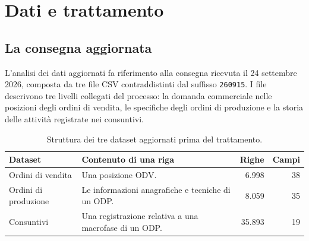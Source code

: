 \section{Dati e trattamento}
\label{sec:data-and-treatment}

\subsection{La consegna aggiornata}
\label{sec:updated-datasets}

L'analisi dei dati aggiornati fa riferimento alla consegna ricevuta il 24 settembre 2026, composta da tre file CSV contraddistinti dal suffisso \texttt{260915}. I file descrivono tre livelli collegati del processo: la domanda commerciale nelle posizioni degli ordini di vendita, le specifiche degli ordini di produzione e la storia delle attività registrate nei consuntivi.

\begin{table}[htbp]
\centering
\caption{Struttura dei tre dataset aggiornati prima del trattamento.}
\label{tab:updated-datasets}
\begin{tabularx}{\linewidth}{@{}lXrr@{}}
\toprule
\textbf{Dataset} & \textbf{Contenuto di una riga} & \textbf{Righe} & \textbf{Campi} \\
\midrule
Ordini di vendita & Una posizione ODV. & 6.998 & 38 \\
Ordini di produzione & Le informazioni anagrafiche e tecniche di un ODP. & 8.059 & 35 \\
Consuntivi & Una registrazione relativa a una macrofase di un ODP. & 35.893 & 19 \\
\bottomrule
\end{tabularx}
\end{table}

